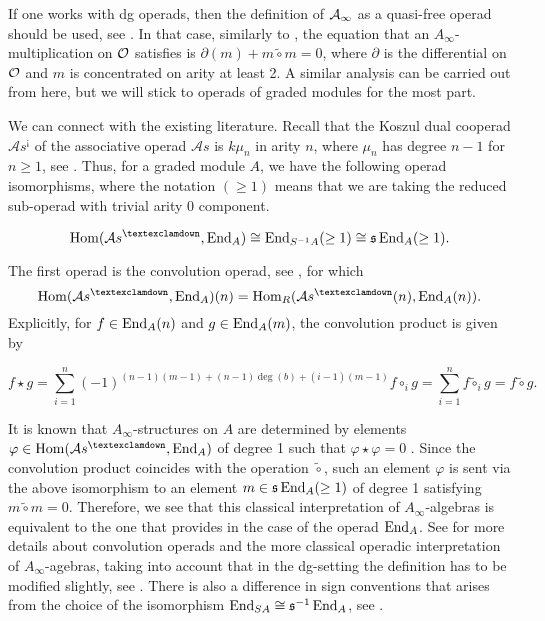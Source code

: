 \documentclass[Thesis.tex]{subfiles}
\begin{document}
\begin{remark}\label{dg}
If one works with dg operads, then the definition of $\mathcal{A}_\infty$ as a quasi-free operad should be used, see . In that case, similarly to , the equation that an $A_\infty$-multiplication on ${\mathcal O}$ satisfies is $\partial(m)+m\tilde{\circ} m = 0$, where $\partial$ is the differential on ${\mathcal O}$ and $m$ is concentrated on arity at least 2. A similar analysis can be carried out from here, but we will stick to operads of graded modules for the most part.
\end{remark}

We can connect  with the existing literature. Recall that the Koszul dual cooperad $\mathcal{A}s^{¡}$ of the associative operad $\mathcal{A}s$ is $k\mu_n$ in arity $n$, where $\mu_n$ has degree $n-1$ for $n\geq 1$, see \cite[\S 7.1]{lodayvallette}. Thus, for a graded module $A$, we have the following operad isomorphisms, where the notation $(\geq 1)$ means that we are taking the reduced sub-operad with trivial arity 0 component.


\[\Hom(\mathcal{A}s^{¡},\End_A)\cong \End_{S^{-1}A}(\geq 1)\cong\s\End_A(\geq 1).\]
 
The first operad is the convolution operad, see \cite[\S 6.4.1]{lodayvallette}, for which \[\Hom(\mathcal{A}s^{¡},\End_A)(n)=\Hom_R(\mathcal{A}s^{¡}(n),\End_A(n)).\] Explicitly, for $f\in\operatorname{End}_A(n)$ and $g\in\operatorname{End}_A(m)$, the convolution product is given by

\[f\star g=\sum_{i=1}^n(-1)^{(n-1)(m-1)+(n-1)\deg(b)+(i-1)(m-1)}f\circ_i g=\sum_{i=1}^nf\tilde{\circ}_i g=f\tilde{\circ}g.\]

It is known that $A_\infty$-structures on $A$ are determined by elements $\varphi\in\Hom(\mathcal{A}s^{¡},\End_A)$ of degree 1 such that $\varphi\star \varphi=0$ \cite[Proposition 10.1.3]{lodayvallette}. Since the convolution product coincides with the operation $\tilde{\circ}$, such an element $\varphi$ is sent via the above isomorphism to an element $m\in\mathfrak{s}\operatorname{End}_A(\geq 1)$ of degree 1 satisfying $m\tilde{\circ}m=0$. Therefore, we see that this classical interpretation of $A_\infty$-algebras is equivalent to the one that  provides in the case of the operad $\operatorname{End}_A$. See \cite[Proposition 10.1.11]{lodayvallette} for more details about convolution operads and the more classical operadic interpretation of $A_\infty$-agebras, taking into account that in the dg-setting the definition has to be modified slightly, see . There is also a difference in sign conventions that arises from the choice of the isomorphism $\operatorname{End}_{SA}\cong\mathfrak{s}^{-1}\operatorname{End}_A$, see .
\end{document}

